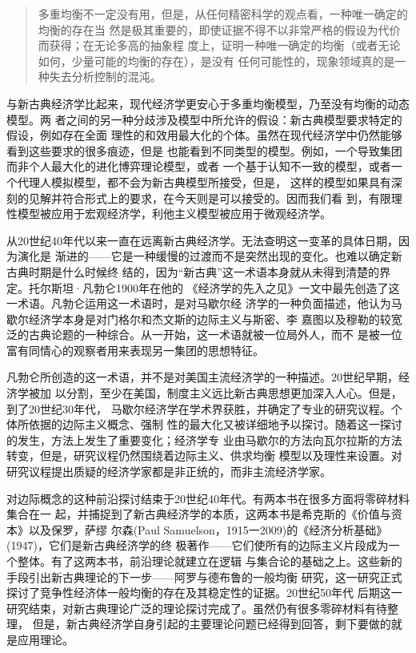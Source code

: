\begin{quotation}
  多重均衡不一定没有用，但是，从任何精密科学的观点看，一种唯一确定的均衡的存在当
  然是极其重要的，即使证据不得不以非常严格的假设为代价而获得；在无论多高的抽象程
  度上，证明一种唯一确定的均衡（或者无论如何，少量可能的均衡的存在），是没有
  任何可能性的，现象领域真的是一种失去分析控制的混沌。
\end{quotation}

与新古典经济学比起来，现代经济学更安心于多重均衡模型，乃至没有均衡的动态模型。两
者之间的另一种分歧涉及模型中所允许的假设：新古典模型要求特定的假设，例如存在全面
理性的和效用最大化的个体。虽然在现代经济学中仍然能够看到这些要求的很多痕迹，但是
也能看到不同类型的模型。例如，一个导致集团而非个人最大化的进化博弈理论模型，或者
一个基于认知不一致的模型，或者一个代理人模拟模型，都不会为新古典模型所接受，但是，
这样的模型如果具有深刻的见解并符合形式上的要求，在今天则是可以接受的。因而我们看
到，有限理性模型被应用于宏观经济学，利他主义模型被应用于微观经济学。

从20世纪40年代以来一直在远离新古典经济学。无法查明这一变革的具体日期，因为演化是
渐进的——它是一种缓慢的过渡而不是突然出现的变化。也难以确定新古典时期是什么时候终
结的，因为“新古典”这一术语本身就从未得到清楚的界定。托尔斯坦·凡勃仑1900年在他的
《经济学的先入之见》一文中最先创造了这一术语。凡勃仑运用这一术语时，是对马歇尔经
济学的一种负面描述，他认为马歇尔经济学本身是对门格尔和杰文斯的边际主义与斯密、李
嘉图以及穆勒的较宽泛的古典论题的一种综合。从一开始，这一术语就被一位局外人，而不
是被一位富有同情心的观察者用来表现另一集团的思想特征。

凡勃仑所创造的这一术语，并不是对美国主流经济学的一种描述。20世纪早期，经济学被加
以分割，至少在美国，制度主义远比新古典思想更加深入人心。但是，到了20世纪30年代，
马歇尔经济学在学术界获胜，并确定了专业的研究议程。个体所依据的边际主义概念、强制
性的最大化又被详细地予以探讨。随着这一探讨的发生，方法上发生了重要变化；经济学专
业由马歇尔的方法向瓦尔拉斯的方法转变，但是，研究议程仍然围绕着边际主义、供求均衡
模型以及理性来设置。对研究议程提出质疑的经济学家都是非正统的，而非主流经济学家。

对边际概念的这种前沿探讨结束于20世纪40年代。有两本书在很多方面将零碎材料集合在一
起，并捕捉到了新古典经济学的本质，这两本书是希克斯的《价值与资本》以及保罗，萨缪
尔森(Paul Samuelson，1915一2009)的《经济分析基础》(1947)，它们是新古典经济学的终
极著作——它们使所有的边际主义片段成为一个整体。有了这两本书，前沿理论就建立在逻辑
与集合论的基础之上。这些新的手段引出新古典理论的下一步——阿罗与德布鲁的一般均衡
研究，这一研究正式探讨了竞争性经济体一般均衡的存在及其稳定性的证据。20世纪50年代
后期这一研究结束，对新古典理论广泛的理论探讨完成了。虽然仍有很多零碎材料有待整理，
但是，新古典经济学自身引起的主要理论问题已经得到回答，剩下要做的就是应用理论。

